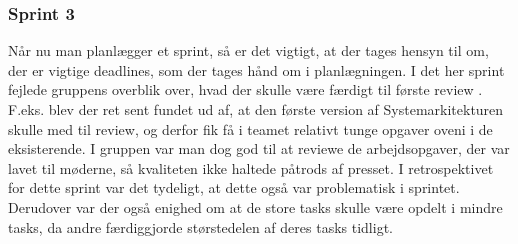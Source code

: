 \documentclass[a4paper,12pt,fleqn,oneside]{article}
\begin{document}
\subsubsection{Sprint 3}
Når nu man planlægger et sprint, så er det vigtigt, at der tages hensyn til om, der er vigtige deadlines, som der tages hånd om i planlægningen. I det her sprint fejlede gruppens overblik over, hvad der skulle være færdigt til første review . F.eks. blev der ret sent fundet ud af, at den første version af Systemarkitekturen skulle med til review, og derfor fik få i teamet relativt tunge opgaver oveni i de eksisterende. I gruppen var man dog god til at reviewe de arbejdsopgaver, der var lavet til møderne, så kvaliteten ikke haltede påtrods af presset. I retrospektivet for dette sprint var det tydeligt, at dette også var problematisk i sprintet. Derudover var der også enighed om at de store tasks skulle være opdelt i mindre tasks, da andre færdiggjorde størstedelen af deres tasks tidligt. 
\end{document}
